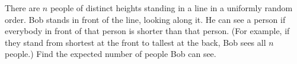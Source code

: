 There are $n$ people of distinct heights standing in a line in a uniformly random order. Bob stands in front of the line, looking along it. He can see a person if everybody in front of that person is shorter than that person. (For example, if they stand from shortest at the front to tallest at the back, Bob sees all $n$ people.) Find the expected number of people Bob can see.
